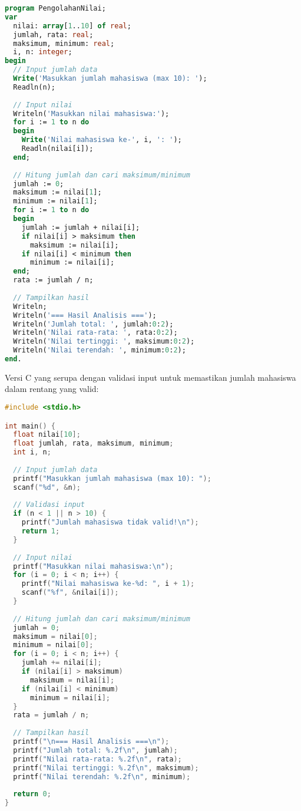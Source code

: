 \documentclass[../main.tex]{subfiles}
\begin{document}
\begin{lstlisting}[language=Pascal, caption={Program lengkap array 1D di Pascal}]
program PengolahanNilai;
var
  nilai: array[1..10] of real;
  jumlah, rata: real;
  maksimum, minimum: real;
  i, n: integer;
begin
  // Input jumlah data
  Write('Masukkan jumlah mahasiswa (max 10): ');
  Readln(n);
  
  // Input nilai
  Writeln('Masukkan nilai mahasiswa:');
  for i := 1 to n do
  begin
    Write('Nilai mahasiswa ke-', i, ': ');
    Readln(nilai[i]);
  end;
  
  // Hitung jumlah dan cari maksimum/minimum
  jumlah := 0;
  maksimum := nilai[1];
  minimum := nilai[1];
  for i := 1 to n do
  begin
    jumlah := jumlah + nilai[i];
    if nilai[i] > maksimum then
      maksimum := nilai[i];
    if nilai[i] < minimum then
      minimum := nilai[i];
  end;
  rata := jumlah / n;
  
  // Tampilkan hasil
  Writeln;
  Writeln('=== Hasil Analisis ===');
  Writeln('Jumlah total: ', jumlah:0:2);
  Writeln('Nilai rata-rata: ', rata:0:2);
  Writeln('Nilai tertinggi: ', maksimum:0:2);
  Writeln('Nilai terendah: ', minimum:0:2);
end.
\end{lstlisting}

Versi C yang serupa dengan validasi input untuk memastikan jumlah mahasiswa dalam rentang yang valid:

\begin{lstlisting}[language=C, caption={Program lengkap array 1D di C}]
#include <stdio.h>

int main() {
  float nilai[10];
  float jumlah, rata, maksimum, minimum;
  int i, n;
  
  // Input jumlah data
  printf("Masukkan jumlah mahasiswa (max 10): ");
  scanf("%d", &n);
  
  // Validasi input
  if (n < 1 || n > 10) {
    printf("Jumlah mahasiswa tidak valid!\n");
    return 1;
  }
  
  // Input nilai
  printf("Masukkan nilai mahasiswa:\n");
  for (i = 0; i < n; i++) {
    printf("Nilai mahasiswa ke-%d: ", i + 1);
    scanf("%f", &nilai[i]);
  }
  
  // Hitung jumlah dan cari maksimum/minimum
  jumlah = 0;
  maksimum = nilai[0];
  minimum = nilai[0];
  for (i = 0; i < n; i++) {
    jumlah += nilai[i];
    if (nilai[i] > maksimum)
      maksimum = nilai[i];
    if (nilai[i] < minimum)
      minimum = nilai[i];
  }
  rata = jumlah / n;
  
  // Tampilkan hasil
  printf("\n=== Hasil Analisis ===\n");
  printf("Jumlah total: %.2f\n", jumlah);
  printf("Nilai rata-rata: %.2f\n", rata);
  printf("Nilai tertinggi: %.2f\n", maksimum);
  printf("Nilai terendah: %.2f\n", minimum);
  
  return 0;
}
\end{lstlisting}
\end{document}

